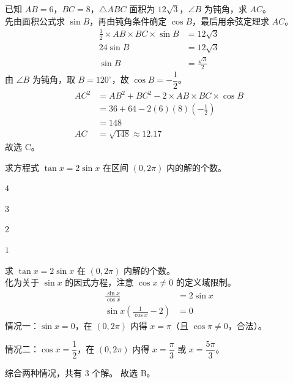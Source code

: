 \documentclass[12pt,a4paper]{exam-zh}
\begin{document}
\begin{solution}
    已知 $AB=6$，$BC=8$，$\triangle ABC$ 面积为 $12\sqrt{3}$，$\angle B$ 为钝角，求 $AC$。 \\
    先由面积公式求 $\sin B$，再由钝角条件确定 $\cos B$，最后用余弦定理求 $AC$。
    \begin{align*}
        \frac{1}{2}\times AB\times BC\times\sin B &= 12\sqrt{3} \\
        24\sin B &= 12\sqrt{3} \\
        \sin B &= \frac{\sqrt{3}}{2}
    \end{align*}
    由 $\angle B$ 为钝角，取 $B=120^{\circ}$，故 $\cos B=-\dfrac{1}{2}$。
    \begin{align*}
        AC^{2} &= AB^{2}+BC^{2}-2\times AB\times BC\times\cos B \\
        &= 36+64-2(6)(8)\left(-\frac{1}{2}\right) \\
        &= 148 \\
        AC &= \sqrt{148} \approx 12.17
    \end{align*}
    故选 C。
\end{solution}

\begin{question}
    求方程式 $\tan x=2\sin x$ 在区间 $(0,2\pi)$ 内的解的个数。\paren[B]
    \begin{choices}
        \item $4$
        \item $3$
        \item $2$
        \item $1$
    \end{choices}
\end{question}

\begin{solution}
    求 $\tan x=2\sin x$ 在 $(0,2\pi)$ 内解的个数。 \\
    化为关于 $\sin x$ 的因式方程，注意 $\cos x\neq0$ 的定义域限制。
    \begin{align*}
        \frac{\sin x}{\cos x} &= 2\sin x \\
        \sin x\left(\frac{1}{\cos x}-2\right) &= 0
    \end{align*}
    情况一：$\sin x=0$，在 $(0,2\pi)$ 内得 $x=\pi$（且 $\cos\pi\neq0$，合法）。

    情况二：$\cos x=\dfrac{1}{2}$，在 $(0,2\pi)$ 内得 $x=\dfrac{\pi}{3}$ 或 $x=\dfrac{5\pi}{3}$。

    综合两种情况，共有 $3$ 个解。
    故选 B。
\end{solution}
\end{document}

